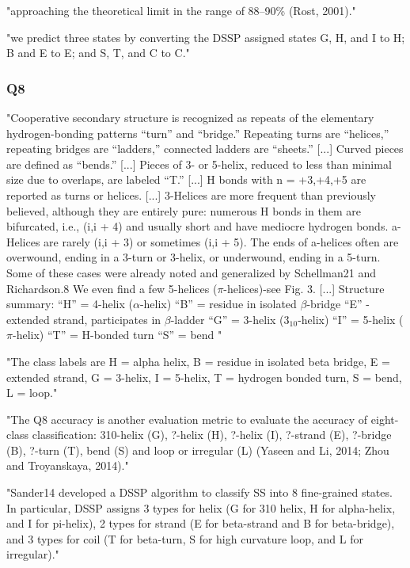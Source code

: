   "approaching the theoretical limit in the range of 88–90\% (Rost, 2001)." \cite{Heffernan2017}

  "we predict three states by converting the DSSP assigned states G, H, and I to H; B and E to E; and S, T, and C to C." \cite{Heffernan2017}
  \subsubsection{Q8}
  "Cooperative secondary structure is recognized as repeats of the elementary hydrogen-bonding patterns “turn” and “bridge.” Repeating turns are “helices,” repeating bridges are “ladders,” connected ladders are “sheets.”
  [...]
  Curved pieces are defined as “bends.”
  [...]
  Pieces of 3- or 5-helix, reduced to less than minimal size due to overlaps, are labeled “T.”
  [...]
  H bonds with n = +3,+4,+5 are reported as turns or helices.
  [...]
  3-Helices are more frequent than previously believed, although they are entirely pure: numerous H bonds in them are bifurcated, i.e., (i,i + 4) and usually short and have mediocre hydrogen bonds. a-Helices are rarely (i,i + 3) or sometimes (i,i + 5). The ends of a-helices often are overwound, ending in a 3-turn or 3-helix, or underwound, ending in a 5-turn. Some of these cases were already noted and generalized by Schellman21 and Richardson.8 We even find a few 5-helices ($\pi$-helices)-see Fig. 3.
  [...]
  Structure summary:
  “H” = 4-helix ($\alpha$-helix)
  “B” = residue in isolated $\beta$-bridge
  “E” - extended strand, participates in $\beta$-ladder
  “G” = 3-helix ($3_{10}$-helix)
  “I” = 5-helix ($\pi$-helix)
  “T” = H-bonded turn
  “S” = bend
  "\cite{Kabsch1983}
  
  "The class labels are H = alpha helix, B = residue in isolated beta bridge, E = extended strand, G = 3-helix, I = 5-helix, T = hydrogen bonded turn, S = bend, L = loop." \cite{Lin2016}

  "The Q8 accuracy is another evaluation metric to evaluate the accuracy of eight-class classification: 310-helix (G), ?-helix (H), ?-helix (I), ?-strand (E), ?-bridge (B), ?-turn (T), bend (S) and loop or irregular (L) (Yaseen and Li, 2014; Zhou and Troyanskaya, 2014)." \cite{Fang2017}

  "Sander14 developed a DSSP algorithm to classify SS into 8 fine-grained states. In particular, DSSP assigns 3 types for helix (G for 310 helix, H for alpha-helix, and I for pi-helix), 2 types for strand (E for beta-strand and B for beta-bridge), and 3 types for coil (T for beta-turn, S for high curvature loop, and L for irregular)." \cite{Wang2016}

